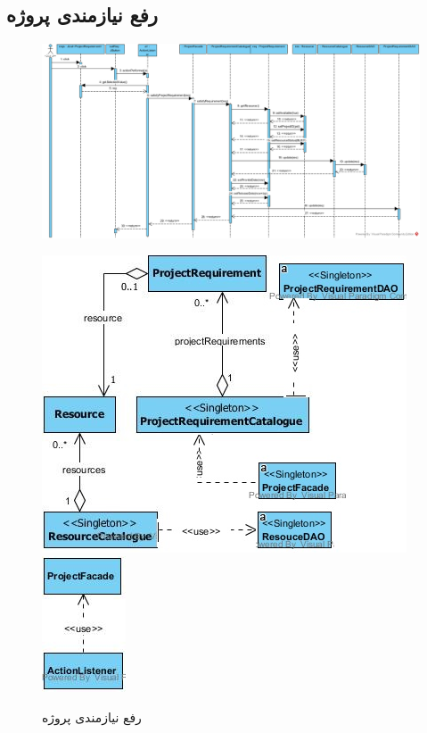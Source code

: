 \begin{landscape}
\newpage
\section{رفع نیازمندی پروژه}
\begin{figure}[H]
	\centering
	\includegraphics[scale=0.5]{img/sequence-design/SatisfyResourceOfProject}
\end{figure}
\begin{figure}[H]
	\centering
	\includegraphics[scale=0.7]{img/sequence-design/SatisfyResourceOfProjectC}
	\includegraphics[scale=0.7]{img/sequence-design/SatisfyResourceOfProjectUI}
\caption{رفع نیازمندی پروژه}
\end{figure}


\end{landscape}
